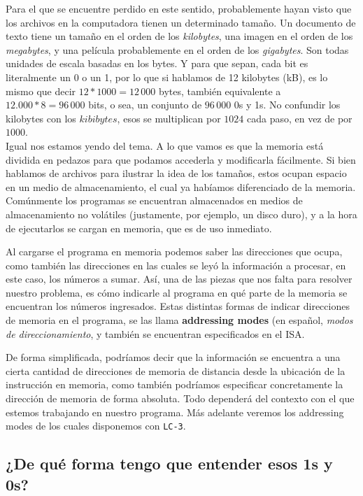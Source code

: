\documentclass[a4paper, titlepage]{report}
\begin{document}
	Para el que se encuentre perdido en este sentido, probablemente hayan visto que los archivos en la computadora tienen un determinado tamaño. Un documento de texto tiene un tamaño en el orden de los \textit{kilobytes}, una imagen en el orden de los \textit{megabytes}, y una película probablemente en el orden de los \textit{gigabytes}. Son todas unidades de escala basadas en los bytes. Y para que sepan, cada bit es literalmente un 0 o un 1, por lo que si hablamos de 12 kilobytes (kB), es lo mismo que decir $12 * 1000 = 12\,000$ bytes, también equivalente a $12.000 * 8 = 96\,000$ bits, o sea, un conjunto de $96\,000$ 0s y 1s. No confundir los kilobytes con los $kibibytes$, esos se multiplican por $1024$ cada paso, en vez de por $1000$.\\
	
	Igual nos estamos yendo del tema. A lo que vamos es que la memoria está dividida en pedazos para que podamos accederla y modificarla fácilmente. Si bien hablamos de archivos para ilustrar la idea de los tamaños, estos ocupan espacio en un medio de almacenamiento, el cual ya habíamos diferenciado de la memoria. Comúnmente los programas se encuentran almacenados  en medios de almacenamiento no volátiles (justamente, por ejemplo, un disco duro), y a la hora de ejecutarlos se cargan en memoria, que es de uso inmediato.
	
	Al cargarse el programa en memoria podemos saber las direcciones que ocupa, como también las direcciones en las cuales se leyó la información a procesar, en este caso, los números a sumar. Así, una de las piezas que nos falta para resolver nuestro problema, es cómo indicarle al programa en qué parte de la memoria se encuentran los números ingresados. Estas distintas formas de indicar direcciones de memoria en el programa, se las llama \textbf{addressing modes} (en español, \textit{modos de direccionamiento}, y también se encuentran especificados en el ISA.
	
	De forma simplificada, podríamos decir que la información se encuentra a una cierta cantidad de direcciones de memoria de distancia desde la ubicación de la instrucción en memoria, como también podríamos especificar concretamente la dirección de memoria de forma absoluta. Todo dependerá del contexto con el que estemos trabajando en nuestro programa. Más adelante veremos los addressing modes de los cuales disponemos con \texttt{LC-3}.
	
	\subsection{¿De qué forma tengo que entender esos 1s y 0s?}
	
\end{document}
